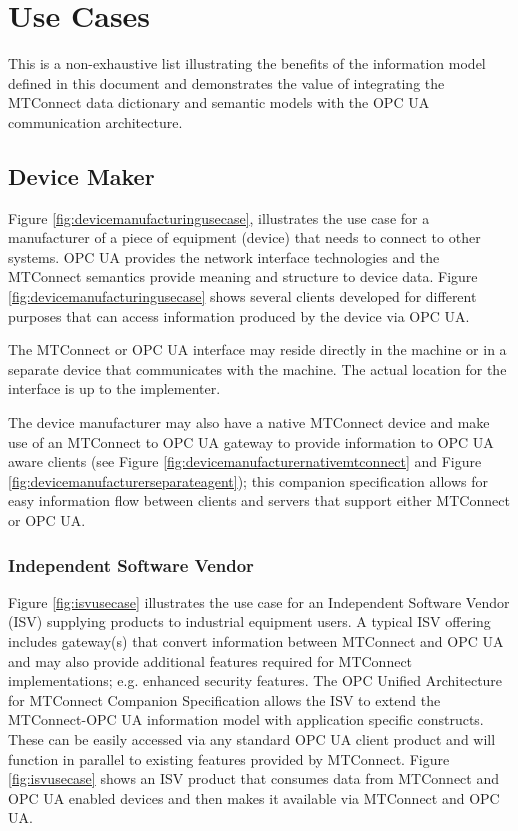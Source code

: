 \section{Use Cases}

This is a non-exhaustive list illustrating the benefits of the  information model defined in this document and demonstrates the value of integrating the MTConnect data dictionary and semantic models with the OPC UA communication architecture.

\subsection{Device Maker}

Figure \ref{fig:devicemanufacturingusecase}, illustrates the use case for a manufacturer of a piece of equipment (device) that needs to connect to other systems. OPC UA provides the network interface technologies and the MTConnect semantics provide meaning and structure to device data. Figure \ref{fig:devicemanufacturingusecase} shows several clients developed for different purposes that can access information produced by the device via OPC UA.


\FloatBarrier

The MTConnect or OPC UA interface may reside directly in the machine or in a separate device that communicates with the machine. The actual location for the interface is up to the implementer.

The device manufacturer may also have a native MTConnect device and make use of an MTConnect to OPC UA gateway to provide  information to OPC UA aware clients (see Figure \ref{fig:devicemanufacturernativemtconnect} and Figure \ref{fig:devicemanufacturerseparateagent}); this companion specification allows for easy information flow between clients and servers that support either MTConnect or OPC UA.





\FloatBarrier

\FloatBarrier

\subsubsection{Independent Software Vendor}

Figure \ref{fig:isvusecase} illustrates the use case for an Independent Software Vendor (ISV) supplying products to industrial equipment users. A typical ISV offering includes gateway(s) that convert information between MTConnect and OPC UA and may also provide additional features required for MTConnect implementations; e.g. enhanced security features. The OPC Unified Architecture for MTConnect Companion Specification allows the ISV to extend the MTConnect-OPC UA information model with application specific constructs. These can be easily accessed via any standard OPC UA client product and will function in parallel to existing features provided by MTConnect. Figure \ref{fig:isvusecase} shows an ISV product that consumes data from MTConnect and OPC UA enabled devices and then makes it available via MTConnect and OPC UA.

